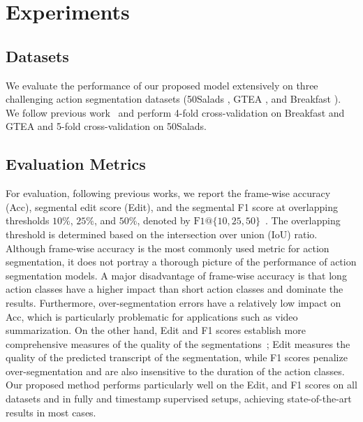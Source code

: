 \section{Experiments}

\subsection{Datasets}
We evaluate the performance of our proposed model extensively on three challenging action segmentation datasets (50Salads \cite{stein2013combining}, GTEA \cite{fathi2011learning}, and Breakfast \cite{kuehne2014language}).  
We follow previous work~\cite{asrf,asformer,li2020ms,farha2019ms,wang2020boundary,chen2020action} and perform 4-fold cross-validation on Breakfast and GTEA and 5-fold cross-validation on 50Salads.

\subsection{Evaluation Metrics}
For evaluation,  following previous works, we report the  frame-wise accuracy (Acc), segmental edit score (Edit), and the segmental F1 score at overlapping thresholds $10\%$, $25\%$, and $50\%$, denoted by $\text{F1@}\{10, 25, 50\}$~\cite{lea2017temporal}. The overlapping threshold is determined based on the intersection over union (IoU) ratio. 
Although frame-wise accuracy is the most commonly used metric for action segmentation, it does not portray a thorough picture of the performance of action segmentation models. 
A major disadvantage of frame-wise accuracy is that long action classes have a higher impact than short action classes and dominate the results. Furthermore, over-segmentation errors have a relatively low impact on Acc, which is particularly problematic for applications such as video summarization.  
On the other hand, Edit and F1 scores establish more comprehensive measures of the quality of the segmentations~\cite{lea2017temporal}; Edit measures the quality of the predicted transcript of the segmentation, while F1 scores penalize over-segmentation and are also insensitive to the duration of the action classes. Our proposed method performs particularly well on the Edit, and F1 scores on all datasets and in fully and timestamp supervised setups, achieving state-of-the-art results in most cases.

